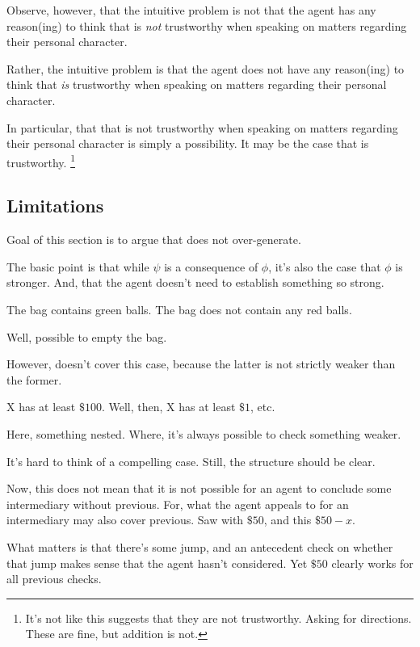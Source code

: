 \begin{note}
  Observe, however, that the intuitive problem is not that the agent has any reason(ing) to think that  is \emph{not} trustworthy when speaking on matters regarding their personal character.

  Rather, the intuitive problem is that the agent does not have any reason(ing) to think that  \emph{is} trustworthy when speaking on matters regarding their personal character.

  In particular, that that  is not trustworthy when speaking on matters regarding their personal character is simply a possibility.
  It may be the case that  is trustworthy.\nolinebreak
  \footnote{
    \color{red}
    It's not like this suggests that they are not trustworthy.
    Asking for directions.
    These are fine, but addition is not.
  }
\end{note}

\subsection{Limitations}
\label{sec:limitations}

\begin{note}
  Goal of this section is to argue that \ideaCS{} does not over-generate.
\end{note}

\begin{note}
  The basic point is that while \(\psi\) is a consequence of \(\phi\), it's also the case that \(\phi\) is stronger.
  And, that the agent doesn't need to establish something so strong.
\end{note}

\begin{note}
  The bag contains green balls.
  The bag does not contain any red balls.

  Well, possible to empty the bag.

  However, \crequ{} doesn't cover this case, because the latter is not strictly weaker than the former.
\end{note}

\begin{note}
  X has at least \(\$100\).
  Well, then, X has at least \(\$1\), etc.

  Here, something nested.
  Where, it's always possible to check something weaker.

  It's hard to think of a compelling case.
  Still, the structure should be clear.

  Now, this does not mean that it is not possible for an agent to conclude some intermediary without previous.
  For, what the agent appeals to for an intermediary may also cover previous.
  Saw with \(\$50\), and this \indicateV{} \(\$50 - x\).

  What matters is that there's some jump, and an antecedent check on whether that jump makes sense that the agent hasn't considered.
  Yet \(\$50\) clearly works for all previous checks.
\end{note}

